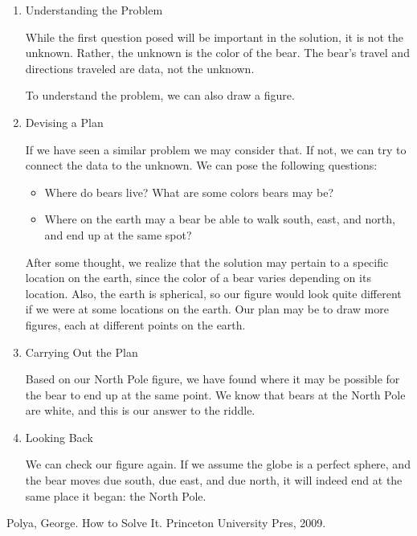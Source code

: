 \begin{enumerate}
   \item Understanding the Problem
  
   While the first question posed will be important in the solution, it is not the unknown. Rather, the unknown is the color of the bear. The bear’s travel and directions traveled are data, not the unknown.
   
   To understand the problem, we can also draw a figure.
   

   \item Devising a Plan
   
   If we have seen a similar problem we may consider that. If not, we can try to connect the data to the unknown. We can pose the following questions:
   
   \begin{itemize}
     \item Where do bears live? What are some colors bears may be?
     \item Where on the earth may a bear be able to walk south, east, and north, and end up at the same spot?
   \end{itemize}
   
   After some thought, we realize that the solution may pertain to a specific location on the earth, since the color of a bear varies depending on its location. Also, the earth is spherical, so our figure would look quite different if we were at some locations on the earth. Our plan may be to draw more figures, each at different points on the earth.
   
   \item Carrying Out the Plan
   
   
   Based on our North Pole figure, we have found where it may be possible for the bear to end up at the same point. We know that bears at the North Pole are white, and this is our answer to the riddle.

   
   \item Looking Back
   
   We can check our figure again. If we assume the globe is a perfect sphere, and the bear moves due south, due east, and due north, it will indeed end at the same place it began: the North Pole.
   
\end{enumerate}

\pagebreak
\begin{thebibliography}{1}

\bibitem{} 
Polya, George. How to Solve It. Princeton University Pres, 2009.

\end{thebibliography}
